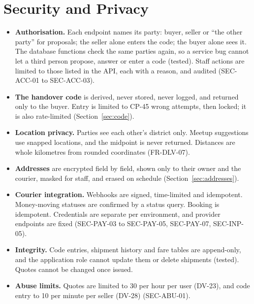 \documentclass[11pt,a4paper]{article}
\begin{document}
\section{Security and Privacy}
\begin{itemize}[nosep]
  \item \textbf{Authorisation.} Each endpoint names its party: buyer, seller or ``the other party'' for proposals; the seller alone enters the code; the buyer alone sees it. The database functions check the same parties again, so a service bug cannot let a third person propose, answer or enter a code (tested). Staff actions are limited to those listed in the API, each with a reason, and audited (SEC-ACC-01 to SEC-ACC-03).
  \item \textbf{The handover code} is derived, never stored, never logged, and returned only to the buyer. Entry is limited to CP-45 wrong attempts, then locked; it is also rate-limited (Section~\ref{sec:code}).
  \item \textbf{Location privacy.} Parties see each other's district only. Meetup suggestions use snapped locations, and the midpoint is never returned. Distances are whole kilometres from rounded coordinates (FR-DLV-07).
  \item \textbf{Addresses} are encrypted field by field, shown only to their owner and the courier, masked for staff, and erased on schedule (Section~\ref{sec:addresses}).
  \item \textbf{Courier integration.} Webhooks are signed, time-limited and idempotent. Money-moving statuses are confirmed by a status query. Booking is idempotent. Credentials are separate per environment, and provider endpoints are fixed (SEC-PAY-03 to SEC-PAY-05, SEC-PAY-07, SEC-INP-05).
  \item \textbf{Integrity.} Code entries, shipment history and fare tables are append-only, and the application role cannot update them or delete shipments (tested). Quotes cannot be changed once issued.
  \item \textbf{Abuse limits.} Quotes are limited to 30 per hour per user (DV-23), and code entry to 10 per minute per seller (DV-28) (SEC-ABU-01).
\end{itemize}
\end{document}
